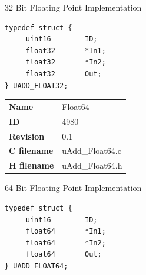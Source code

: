 32 Bit Floating Point Implementation

\begin{lstlisting}
typedef struct {
     uint16        ID;
     float32       *In1;
     float32       *In2;
     float32       Out;
} UADD_FLOAT32;
\end{lstlisting}

\ifdefined \AddTestReports
{}
\fi
{}
\nopagebreak[0]
\begin{tabular}{l l}
\textbf{Name} & Float64 \tabularnewline
\textbf{ID} & 4980 \tabularnewline
\textbf{Revision} & 0.1 \tabularnewline
\textbf{C filename} & uAdd\_Float64.c \tabularnewline
\textbf{H filename} & uAdd\_Float64.h \tabularnewline
\end{tabular}
\vspace{1ex}

64 Bit Floating Point Implementation

\begin{lstlisting}
typedef struct {
     uint16        ID;
     float64       *In1;
     float64       *In2;
     float64       Out;
} UADD_FLOAT64;
\end{lstlisting}

\ifdefined \AddTestReports
{}
\fi
